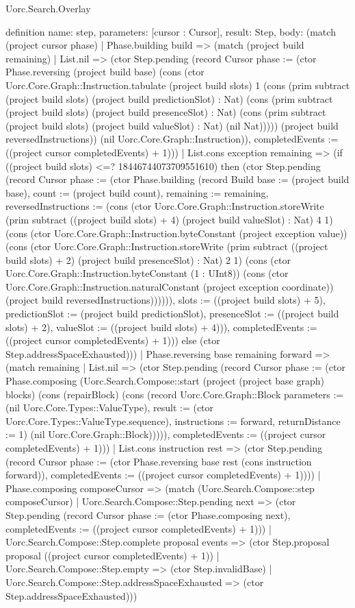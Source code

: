 \begin{lexlean}{Uorc.Search.Overlay}
\begin{semanticmodule}
definition{
  name: step,
  parameters: [cursor : Cursor],
  result: Step,
  body: (match (project cursor phase)
    | Phase.building build => (match (project build remaining)
      | List.nil => (ctor Step.pending (record Cursor {phase := (ctor Phase.reversing (project build base) (cons (ctor Uorc.Core.Graph::Instruction.tabulate (project build slots) 1 (cons (prim subtract (project build slots) (project build predictionSlot) : Nat) (cons (prim subtract (project build slots) (project build presenceSlot) : Nat) (cons (prim subtract (project build slots) (project build valueSlot) : Nat) (nil Nat))))) (project build reversedInstructions)) (nil Uorc.Core.Graph::Instruction)), completedEvents := ((project cursor completedEvents) + 1)}))
      | List.cons exception remaining => (if ((project build slots) <=? 18446744073709551610) then (ctor Step.pending (record Cursor {phase := (ctor Phase.building (record Build {base := (project build base), count := (project build count), remaining := remaining, reversedInstructions := (cons (ctor Uorc.Core.Graph::Instruction.storeWrite (prim subtract ((project build slots) + 4) (project build valueSlot) : Nat) 4 1) (cons (ctor Uorc.Core.Graph::Instruction.byteConstant (project exception value)) (cons (ctor Uorc.Core.Graph::Instruction.storeWrite (prim subtract ((project build slots) + 2) (project build presenceSlot) : Nat) 2 1) (cons (ctor Uorc.Core.Graph::Instruction.byteConstant (1 : UInt8)) (cons (ctor Uorc.Core.Graph::Instruction.naturalConstant (project exception coordinate)) (project build reversedInstructions)))))), slots := ((project build slots) + 5), predictionSlot := (project build predictionSlot), presenceSlot := ((project build slots) + 2), valueSlot := ((project build slots) + 4)})), completedEvents := ((project cursor completedEvents) + 1)})) else (ctor Step.addressSpaceExhausted)))
    | Phase.reversing base remaining forward => (match remaining
      | List.nil => (ctor Step.pending (record Cursor {phase := (ctor Phase.composing (Uorc.Search.Compose::start (project (project base graph) blocks) (cons (repairBlock) (cons (record Uorc.Core.Graph::Block {parameters := (nil Uorc.Core.Types::ValueType), result := (ctor Uorc.Core.Types::ValueType.sequence), instructions := forward, returnDistance := 1}) (nil Uorc.Core.Graph::Block))))), completedEvents := ((project cursor completedEvents) + 1)}))
      | List.cons instruction rest => (ctor Step.pending (record Cursor {phase := (ctor Phase.reversing base rest (cons instruction forward)), completedEvents := ((project cursor completedEvents) + 1)})))
    | Phase.composing composeCursor => (match (Uorc.Search.Compose::step composeCursor)
      | Uorc.Search.Compose::Step.pending next => (ctor Step.pending (record Cursor {phase := (ctor Phase.composing next), completedEvents := ((project cursor completedEvents) + 1)}))
      | Uorc.Search.Compose::Step.complete proposal events => (ctor Step.proposal proposal ((project cursor completedEvents) + 1))
      | Uorc.Search.Compose::Step.empty => (ctor Step.invalidBase)
      | Uorc.Search.Compose::Step.addressSpaceExhausted => (ctor Step.addressSpaceExhausted)))
}
\end{semanticmodule}
\end{lexlean}
